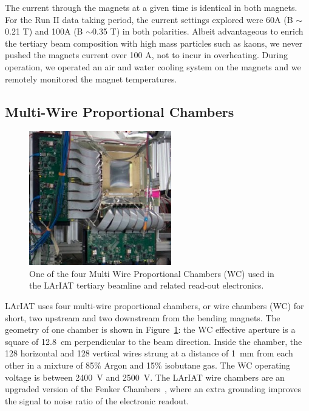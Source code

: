 The current through the magnets at a given time is identical in both magnets. For the Run II data taking period, the current settings explored were 60A (B $\sim$0.21 T) and 100A (B $\sim$0.35 T) in both polarities. 
Albeit advantageous to enrich the tertiary beam composition with high mass particles such as kaons, we never pushed the magnets current over 100 A, not to incur in overheating.  During operation, we operated an air and water cooling system on the magnets and we remotely monitored the magnet temperatures.
 
\subsection{Multi-Wire Proportional Chambers}\label{sec:MWPC}
\begin{figure}[!h]
\begin{centering}
\vspace{-0.3cm}
\includegraphics[height=2.3in]{Chapter-3/Images/WireChamber.png}
\caption{
{One of the four Multi Wire Proportional Chambers (WC) used in the LArIAT tertiary beamline and related read-out electronics.}
}
\label{fig:wirechamber}
\end{centering}
\end{figure}

LArIAT uses four multi-wire proportional chambers, or wire chambers (WC) for short, two upstream and two downstream from the bending magnets. The geometry of one chamber is shown in Figure~\ref{fig:wirechamber}: the WC effective aperture is a square of  12.8~cm perpendicular to the beam direction.  Inside the chamber, the 128 horizontal and 128 vertical wires strung at a distance of 1~mm from each other in a mixture of 85\% Argon and 15\% isobutane gas.  The WC operating voltage is between 2400~V and 2500~V. The LArIAT wire chambers are an upgraded version of the Fenker Chambers~\cite{Fenker}, where an extra grounding improves the signal to noise ratio of the electronic readout.  

